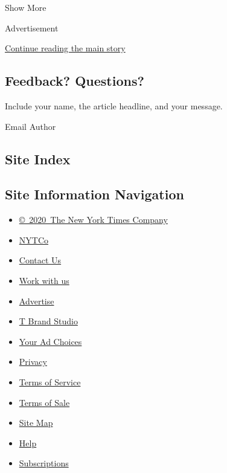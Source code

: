 Show More

Advertisement

\protect\hyperlink{after-mid2}{Continue reading the main story}

\hypertarget{feedback-questions}{%
\subsection{Feedback? Questions?}\label{feedback-questions}}

Include your name, the article headline, and your message.

Email Author

\hypertarget{site-index}{%
\subsection{Site Index}\label{site-index}}

\hypertarget{site-information-navigation}{%
\subsection{Site Information
Navigation}\label{site-information-navigation}}

\begin{itemize}
\tightlist
\item
  \href{https://help.nytimes3xbfgragh.onion/hc/en-us/articles/115014792127-Copyright-notice}{©~2020~The
  New York Times Company}
\end{itemize}

\begin{itemize}
\tightlist
\item
  \href{https://www.nytco.com/}{NYTCo}
\item
  \href{https://help.nytimes3xbfgragh.onion/hc/en-us/articles/115015385887-Contact-Us}{Contact
  Us}
\item
  \href{https://www.nytco.com/careers/}{Work with us}
\item
  \href{https://nytmediakit.com/}{Advertise}
\item
  \href{http://www.tbrandstudio.com/}{T Brand Studio}
\item
  \href{https://www.nytimes3xbfgragh.onion/privacy/cookie-policy\#how-do-i-manage-trackers}{Your
  Ad Choices}
\item
  \href{https://www.nytimes3xbfgragh.onion/privacy}{Privacy}
\item
  \href{https://help.nytimes3xbfgragh.onion/hc/en-us/articles/115014893428-Terms-of-service}{Terms
  of Service}
\item
  \href{https://help.nytimes3xbfgragh.onion/hc/en-us/articles/115014893968-Terms-of-sale}{Terms
  of Sale}
\item
  \href{https://spiderbites.nytimes3xbfgragh.onion}{Site Map}
\item
  \href{https://help.nytimes3xbfgragh.onion/hc/en-us}{Help}
\item
  \href{https://www.nytimes3xbfgragh.onion/subscription?campaignId=37WXW}{Subscriptions}
\end{itemize}
